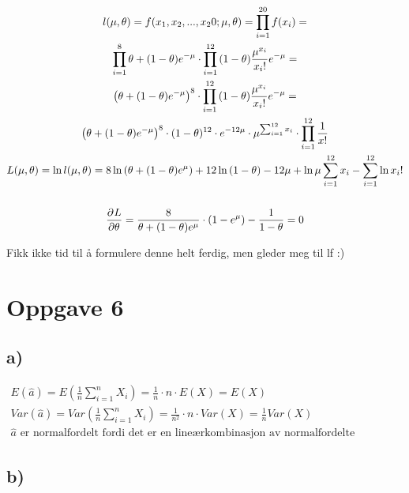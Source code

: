 \begin{gather*}
	l(\mu, \theta) = f(x_1, x_2, ..., x_20; \mu, \theta) = \prod_{i = 1}^{20}{f(x_i)} =
	\\
	\prod_{i = 1}^{8}{\theta + (1 - \theta) e^{-\mu}} \cdot \prod_{i = 1}^{12}{(1 - \theta) \frac{\mu^{x_i}}{x_i!} e^{-\mu}} =
	\\
	\left(\theta + (1 - \theta) e^{-\mu}\right)^8 \cdot \prod_{i = 1}^{12}{(1 - \theta) \frac{\mu^{x_i}}{x_i!} e^{-\mu}} =
	\\
	\left(\theta + (1 - \theta) e^{-\mu}\right)^8 \cdot (1 - \theta)^{12} \cdot
	e^{-12 \mu} \cdot \mu^{\sum_{i = 1}^{12}{x_i}} \cdot \prod_{i = 1}^{12}{\frac{1}{x!}}
	\\
	L(\mu, \theta) = \ln{l(\mu, \theta)} = 8 \ln{(\theta + (1 - \theta) e^{\mu})} + 12 \ln{(1 - \theta)} - 12 \mu
	+ \ln{\mu} \sum_{i = 1}^{12}{x_i} - \sum_{i = 1}^{12}{\ln{x_i!}}
	\\
	\\
	\frac{\partial^{} L}{\partial \theta^{}} = \frac{8}{\theta + (1 - \theta) e^\mu} \cdot (1 - e^{\mu}) - \frac{1}{1 - \theta} = 0
\end{gather*}


Fikk ikke tid til å formulere denne helt ferdig, men gleder meg til lf :)


\section*{Oppgave 6}

\subsection*{a)}

\begin{gather*}
	E(\hat a) = E\left(\frac{1}{n} \sum_{i = 1}^n{X_i}\right) = \frac{1}{n} \cdot n \cdot E(X) = E(X)
	\\
	Var(\hat a) = Var\left(\frac{1}{n} \sum_{i = 1}^n{X_i}\right) = \frac{1}{n^2} \cdot n \cdot Var(X) = \frac{1}{n} Var(X)
	\\
	\hat a \text{ er normalfordelt fordi det er en lineærkombinasjon av normalfordelte stokastiske variabler}
\end{gather*}


\subsection*{b)}


